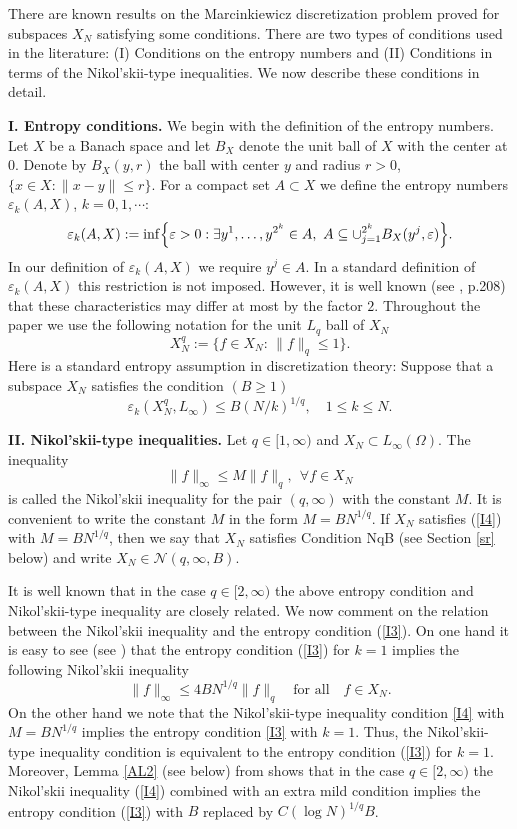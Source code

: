 \documentclass[12pt]{article}
\def \cN{\mathcal N}
\def \e{\varepsilon}
\numberwithin{equation}{section}
\newcommand{\be}{\begin{equation}}
\newcommand{\ee}{\end{equation}}
\begin{document}
There are known results on the Marcinkiewicz discretization problem proved for subspaces $X_N$
satisfying some conditions. There are two types of conditions used in the literature: (I) Conditions on the entropy numbers and (II) Conditions in terms of the Nikol'skii-type inequalities. We now describe these conditions in detail. 

{\bf I. Entropy conditions.} We begin with the definition of the entropy numbers.
  Let $X$ be a Banach space and let $B_X$ denote the unit ball of $X$ with the center at $0$. Denote by $B_X(y,r)$ the ball with center $y$ and radius $r>0$,  $\{x\in X:\|x-y\|\le r\}$. For a compact set $A\subset X$  we define the entropy numbers $\e_k(A,X)$, $k=0,1,\cdots$: 
$$
\e_k(A,X)  :=\inf \Bigl\{\e>0 : \exists y^1,\dots ,y^{2^k} \in A ,\    A \subseteq \cup_{j=1}
^{2^k} B_X(y^j,\e)\Bigr\}.
$$
In our definition of   $\e_k(A,X)$ we require $y^j\in A$. In a standard definition of $\e_k(A,X)$ this restriction is not imposed. 
However, it is well known (see \cite{VTbook}, p.208) that these characteristics may differ at most by the factor $2$. Throughout the paper we use the following notation for the unit $L_q$ ball of $X_N$
$$
X_N^q:= \{f\in X_N:\, \|f\|_q \le 1\}.
$$
Here is a standard  entropy assumption in discretization theory: Suppose that a subspace $X_N$ satisfies the condition $(B\ge 1)$
\be\label{I3}
\e_k(X^q_N,L_\infty) \le  B  (N/k)^{1/q},\quad 1\le k\le N.
 \ee

{\bf II. Nikol'skii-type inequalities.} Let $q\in [1,\infty)$ and $X_N\subset L_\infty(\Omega)$. The inequality
\begin{equation}\label{I4}
\|f\|_\infty \leq M\|f\|_q,\   \ \forall f\in X_N
\end{equation}
is called the Nikol'skii inequality for the pair $(q,\infty)$ with the constant $M$. 
It is convenient to write the constant $M$ in the form $M=BN^{1/q}$. If $X_N$ satisfies 
(\ref{I4}) with $M=BN^{1/q}$, then we say that $X_N$ satisfies Condition NqB (see Section \ref{sr}
below) and write $X_N \in \cN(q,\infty,B)$.

 It is well known that in the case $q\in [2,\infty)$ the above entropy condition and Nikol'skii-type inequality are closely related. We now comment on the relation between the Nikol'skii inequality and
the entropy condition (\ref{I3}). On one hand it is easy to see (see \cite{DPSTT2}) that the entropy condition (\ref{I3}) for $k=1$ implies the following Nikol'skii inequality
$$
\|f\|_\infty \le 4BN^{1/q}\|f\|_q \quad \text{for all}\quad f\in X_N.
$$
On the other hand we note that the Nikol'skii-type
inequality condition \eqref{I4} with $M=B N^{1/q}$ implies
 the entropy condition \eqref{I3} with $k=1$. Thus, the Nikol'skii-type
inequality condition is equivalent to the entropy condition (\ref{I3}) for $k=1$.
Moreover, Lemma \ref{AL2} (see below)   from
\cite{VT180} shows that in the case $q\in [2,\infty)$ the Nikol'skii inequality (\ref{I4}) combined with an extra mild condition implies  the entropy condition (\ref{I3}) with $B$ replaced by $C(\log N)^{1/q}B$.
\end{document}
